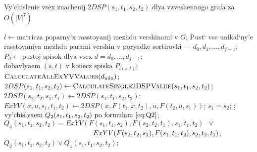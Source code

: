\begin{algorithm}
\caption{Vy'chislenie vsex znachenij $2DSP(s_1, t_1, s_2, t_2)$ dlya vzveshennogo grafa za $O(|V|^7)$} \label{alg:n7w}
\begin{algorithmic}[1]
\State $l \gets \text{matricza poparny'x rasstoyanij mezhdu vershinami v }G$;
\State Pust` vse unikal`ny'e rasstoyaniya mezhdu parami vershin v poryadke sortirovki --- $d_0, d_1, \ldots, d_{f-1}$;
\State $P_d \gets \text{pustoj spisok dlya vsex }d = d_0, \ldots, d_{f-1}$;
    \State $\text{dobavlyaem }(s, t)\text{ v konecz spiska }P_{l(s, t)}$;
\EndFor
{}
    \State $\textsc{CalculateAllExYVValues}(d_{\min})$; \label{line:calcExYVw}
                \State $2DSP(s_1, t_1, s_2, t_2) \gets \textsc{CalculateSingle2DSPValue}(s_1, t_1, s_2, t_2)$;
                \State $2DSP(s_2, t_2, s_1, t_1) \gets 2DSP(s_1, t_1, s_2, t_2)$; 
            \EndFor
        \EndFor
    \EndFor
\EndFor
\EndProcedure
\Statex
{}
                \State $ExYV(x,u,s_1,t_1,t_2) \gets 2DSP(x, F(t_1,x,t_2), u, F(t_2,u,s_1))$;
            \EndFor
        \EndFor
    \EndFor
\EndProcedure
\Statex
{}
    \State \Return $s_1 = s_2$; 
    \State {};
\Else
    \State $\text{vy'chislyaem }Q_2(s_1, t_1, s_2, t_2)\text{ po formulam \eqref{eq:Q2}}$; 
    \State $Q_4(s_1, t_1, s_2, t_2) = ExYV(F(s_1, t_1, s_2), F(s_2, t_2, t_1), s_1, t_1, t_2)\enspace\vee\enspace$ 
    \Statex $\hspace{4.5cm}ExYV(F(s_2, t_2, s_1), F(s_1, t_1, t_2), s_2, t_2, t_1)$;
    \State \Return $Q_2(s_1, t_1, s_2, t_2) \vee Q_4(s_1, t_1, s_2, t_2)$;
\EndIf
\EndProcedure
\end{algorithmic}
\end{algorithm}
